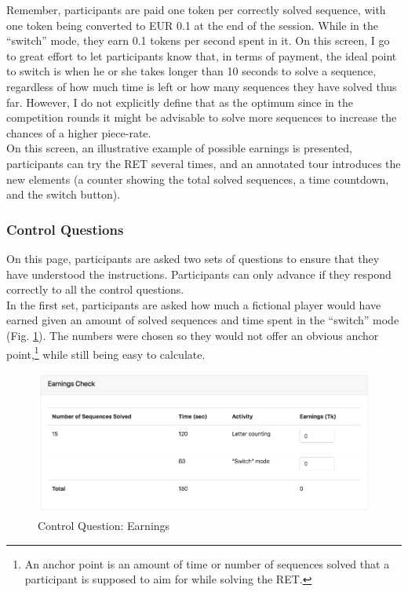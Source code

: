     Remember, participants are paid one token per correctly solved sequence, with one token being converted to EUR 0.1 at the end of the session. While in the ``switch'' mode, they earn 0.1 tokens per second spent in it. On this screen, I go to great effort to let participants know that, in terms of payment, the ideal point to switch is when he or she takes longer than 10 seconds to solve a sequence, regardless of how much time is left or how many sequences they have solved thus far. However, I do not explicitly define that as the optimum since in the competition rounds it might be advisable to solve more sequences to increase the chances of a higher piece-rate.\\
    
    \vspace{-2mm}
    On this screen, an illustrative example of possible earnings is presented, participants can try the RET several times, and an annotated tour introduces the new elements (a counter showing the total solved sequences, a time countdown, and the switch button).
    
    \vspace{-2mm}
    \subsubsection{Control Questions}
    
    \vspace{-2mm}
    On this page, participants are asked two sets of questions to ensure that they have understood the instructions. Participants can only advance if they respond correctly to all the control questions.\\
    
    \vspace{-2mm}
    In the first set, participants are asked how much a fictional player would have earned given an amount of solved sequences and time spent in the ``switch'' mode (Fig. \ref{fig:cq_earnings}). The numbers were chosen so they would not offer an obvious anchor point,\footnote{An anchor point is an amount of time or number of sequences solved that a participant is supposed to aim for while solving the RET.} while still being easy to calculate.\\
    
    \vspace{-2mm}
    \begin{figure}[H]
        \centering
        \includegraphics[width=\textwidth]{graphs/cq_earnings.png}
        \caption{Control Question: Earnings}
        \label{fig:cq_earnings}
    \end{figure}
    

